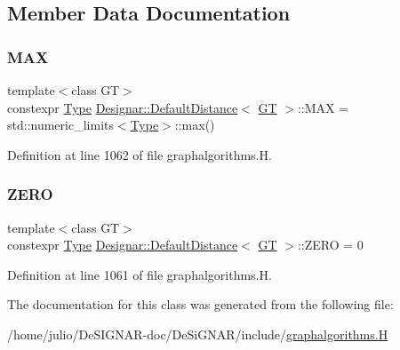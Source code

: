 \subsection{Member Data Documentation}
\mbox{\label{class_designar_1_1_default_distance_af1c417705ee2d66f828c0f872607a7ea}} 
\subsubsection{\texorpdfstring{M\+AX}{MAX}}
{\footnotesize\ttfamily template$<$class GT$>$ \\
constexpr \hyperlink{class_designar_1_1_default_distance_a9317a5edf566779550b96edd532b502b}{Type} \hyperlink{class_designar_1_1_default_distance}{Designar\+::\+Default\+Distance}$<$ \hyperlink{demo-buildgraph_8_c_a3001c40d2c31ca87ed96cd7d1334a55e}{GT} $>$\+::M\+AX = std\+::numeric\+\_\+limits$<$\hyperlink{class_designar_1_1_default_distance_a9317a5edf566779550b96edd532b502b}{Type}$>$\+::max()\hspace{0.3cm}{\ttfamily [static]}}



Definition at line 1062 of file graphalgorithms.\+H.

\mbox{\label{class_designar_1_1_default_distance_abee3d9a2a3f573d6844c0a0fdbd4d7ac}} 
\subsubsection{\texorpdfstring{Z\+E\+RO}{ZERO}}
{\footnotesize\ttfamily template$<$class GT$>$ \\
constexpr \hyperlink{class_designar_1_1_default_distance_a9317a5edf566779550b96edd532b502b}{Type} \hyperlink{class_designar_1_1_default_distance}{Designar\+::\+Default\+Distance}$<$ \hyperlink{demo-buildgraph_8_c_a3001c40d2c31ca87ed96cd7d1334a55e}{GT} $>$\+::Z\+E\+RO = 0\hspace{0.3cm}{\ttfamily [static]}}



Definition at line 1061 of file graphalgorithms.\+H.



The documentation for this class was generated from the following file\+:\begin{DoxyCompactItemize}
\item 
/home/julio/\+De\+S\+I\+G\+N\+A\+R-\/doc/\+De\+Si\+G\+N\+A\+R/include/\hyperlink{graphalgorithms_8_h}{graphalgorithms.\+H}\end{DoxyCompactItemize}
